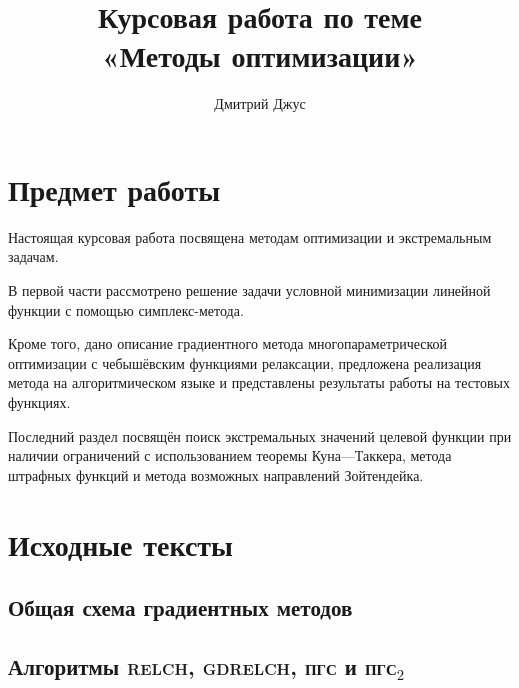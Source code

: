 \documentclass{article}
\newcommand{\relch}{\textsc{relch}}
\newcommand{\gdrelch}{\textsc{gdrelch}}
\newcommand{\gd}{\textsc{пгс}}
\newcommand{\rgd}{\textsc{пгс}$_2$}
\theoremstyle{ruthm}
\numberwithin{thm}{section}
\theoremstyle{rurem}
\theoremstyle{rudfn}
\numberwithin{equation}{section}
\begin{document}
\author{Дмитрий Джус}
\title{Курсовая работа по теме \\
  \Huge{«Методы оптимизации»}}
\pretitle{\begin{center}\LARGE}
\posttitle{\par\end{center}\vskip 3pc}
\date{}
\maketitle
\thispagestyle{empty}

\clearpage
\tableofcontents

\listoffigures

\clearpage
\section{Предмет работы}

Настоящая курсовая работа посвящена методам оптимизации и
экстремальным задачам.

В первой части рассмотрено решение задачи условной минимизации
линейной функции с помощью симплекс-метода.

Кроме того, дано описание градиентного метода многопараметрической
оптимизации с чебышёвским функциями релаксации, предложена реализация
метода на алгоритмическом языке и представлены результаты работы на
тестовых функциях.

Последний раздел посвящён поиск экстремальных значений целевой функции
при наличии ограничений с использованием теоремы Куна—Таккера, метода
штрафных функций и метода возможных направлений Зойтендейка.

\clearpage


\clearpage


\clearpage


\clearpage


\clearpage
\appendix
\section{Исходные тексты}
\label{sec:sources}

\subsection{Общая схема градиентных методов}


\subsection{Алгоритмы \relch{}, \gdrelch{}, \gd{} и \rgd{}}

\end{document}

